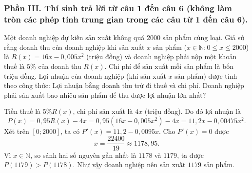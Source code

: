 \subsubsection*{Phần III. Thí sinh trả lời từ câu 1 đến câu 6 (không làm tròn các phép tính trung gian trong các câu từ 1 đến câu 6).}
\setcounter{bt}{0}
\begin{baitap}
	Một doanh nghiệp dự kiến sản xuất không quá 2000 sản phẩm cùng loại. Giả sử rằng doanh thu của doanh nghiệp khi sản xuất $x$ sản phẩm ($x \in \mathbb{N}; 0 \le x \le 2000$) là $R(x) = 16x - 0{,}005x^2$ (triệu đồng) và doanh nghiệp phải nộp một khoản thuế là $5\%$ của doanh thu $R(x)$. Chi phí để sản xuất mỗi sản phẩm là bốn triệu đồng. Lợi nhuận của doanh nghiệp (khi sản xuất $x$ sản phẩm) được tính theo công thức: Lợi nhuận bằng doanh thu trừ đi thuế và chi phí. Doanh nghiệp phải sản xuất bao nhiêu sản phẩm để thu được lợi nhuận lớn nhất?
	\begin{traloi}
		
		Tiền thuế là \(5\%R(x)\), chi phí sản xuất là \(4x\) (triệu đồng). Do đó lợi nhuận là
		$$ P(x)=0{,}95R(x)-4x=0{,}95(16x-0{,}005x^2)-4x=11{,}2x-0{,}00475x^2. $$
		Xét trên \([0;2000]\), ta có \(P'(x)=11{,}2-0{,}0095x\). Cho \(P'(x)=0\) được $$x=\frac{22400}{19}\approx1178{,}95.$$
		Vì \(x\in\mathbb N\), so sánh hai số nguyên gần nhất là \(1178\) và \(1179\), ta được \(P(1179)>P(1178)\). Như vậy doanh nghiệp nên sản xuất \(1179\) sản phẩm.
	\end{traloi}
\end{baitap}

